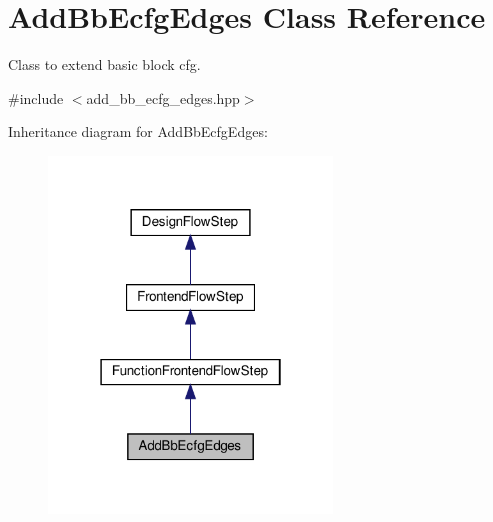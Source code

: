 \hypertarget{classAddBbEcfgEdges}{}\section{Add\+Bb\+Ecfg\+Edges Class Reference}
\label{classAddBbEcfgEdges}


Class to extend basic block cfg.  




{\ttfamily \#include $<$add\+\_\+bb\+\_\+ecfg\+\_\+edges.\+hpp$>$}



Inheritance diagram for Add\+Bb\+Ecfg\+Edges\+:
\nopagebreak
\begin{figure}[H]
\begin{center}
\leavevmode
\includegraphics[width=214pt]{df/ddf/classAddBbEcfgEdges__inherit__graph}
\end{center}
\end{figure}


